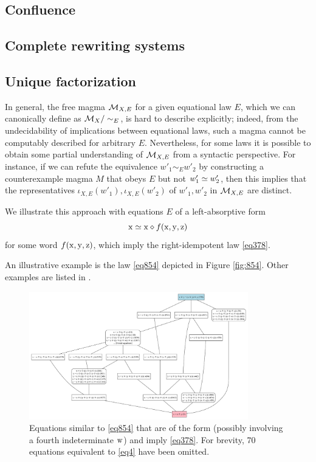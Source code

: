 \subsection{Confluence}


\subsection{Complete rewriting systems}


\subsection{Unique factorization}

In general, the free magma ${\mathcal{M}}_{X,E}$ for a given equational law $E$, which we can canonically define as ${\mathcal{M}}_X / \sim_E$, is hard to describe explicitly; indeed, from the undecidability of implications between equational laws, such a magma cannot be computably described for arbitrary $E$.  Nevertheless, for some laws it is possible to obtain some partial understanding of ${\mathcal{M}}_{X,E}$ from a syntactic perspective.  For instance, if we can refute the equivalence $w'_1 \sim_E w'_2$ by constructing a counterexample magma $M$ that obeys $E$ but not $w'_1 \simeq w'_2$, then this implies that the representatives $\iota_{X,E}(w'_1), \iota_{X,E}(w'_2)$ of  $w'_1, w'_2$ in ${\mathcal{M}}_{X,E}$ are distinct.

We illustrate this approach with equations $E$ of a left-absorptive form
\begin{equation}\label{left-absorptive}
\mathrm{x} \simeq \mathrm{x} \diamond f(\mathrm{x},\mathrm{y},\mathrm{z})
\end{equation}
for some word $f(\mathrm{x},\mathrm{y},\mathrm{z})$, which imply the right-idempotent law \eqref{eq378}.

An illustrative example is the law \eqref{eq854} depicted in Figure \ref{fig:854}. Other examples are listed in .

\begin{figure}
  \centering
  \includegraphics[width=0.85\textwidth]{854-like.png}
  \caption{Equations similar to \eqref{eq854} that are of the form  (possibly involving a fourth indeterminate $\mathrm{w}$) and imply \eqref{eq378}.  For brevity, 70 equations equivalent to \eqref{eq4} have been omitted.}
  \label{fig:854-like}
  \end{figure}


